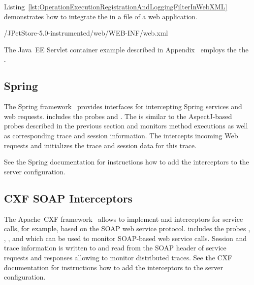 Listing~\ref{lst:OperationExecutionRegistrationAndLoggingFilterInWebXML} %
demonstrates how to integrate the  %
in a  file of a web application. 

\setXMLListing
%
{\JavaEEServletExampleDir/JPetStore-5.0-instrumented/web/WEB-INF/web.xml}

\noindent The Java~EE Servlet container example described in Appendix~\label{appendix:JavaEEServletExample} employs the %
the .

\subsection{Spring}\label{sec:traceAnalysis:instr:spring}

The Spring framework~\cite{Spring-WebSite} provides interfaces for intercepting %
Spring services and web requests. %
\Kieker{} includes the probes %
 and
. %
The  is similar to the %
AspectJ-based probes described in the previous section and monitors method %
executions as well as corresponding trace and session information. %
The  intercepts %
incoming Web requests and initializes the trace and session data for this %
trace.

See the Spring documentation for instructions how to add the interceptors %
to the server configuration.

\subsection{CXF SOAP Interceptors}\label{sec:traceAnalysis:instr:cxf}

The Apache~CXF framework~\cite{CXF-WebSite} allows to implement and interceptors for service calls, %
for example, based on the SOAP web service protocol. %
\Kieker{} includes the probes %
, %
, %
, and %
 which can be used to %
monitor SOAP-based web service calls. %
Session and trace information is written to and read from the SOAP header of %
service requests and responses allowing to monitor distributed traces. %
See the CXF documentation for instructions how to add the interceptors %
to the server configuration.

